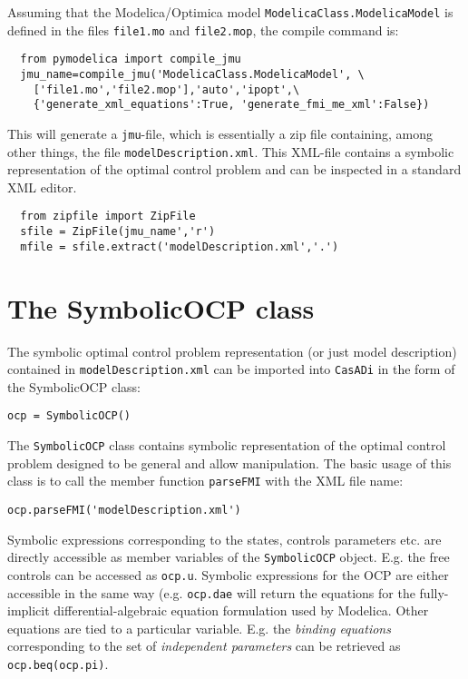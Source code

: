 \documentclass[a4paper,12pt]{book}
\newcommand{\CasADi}{\texttt{CasADi}\xspace}
\begin{document}
Assuming that the Modelica/Optimica model \texttt{ModelicaClass.ModelicaModel} is defined in the files \texttt{file1.mo} and \texttt{file2.mop}, the compile command is:
\begin{verbatim}
  from pymodelica import compile_jmu
  jmu_name=compile_jmu('ModelicaClass.ModelicaModel', \
    ['file1.mo','file2.mop'],'auto','ipopt',\
    {'generate_xml_equations':True, 'generate_fmi_me_xml':False})
\end{verbatim}

This will generate a \texttt{jmu}-file, which is essentially a zip file containing, among other things, the file \texttt{modelDescription.xml}. This XML-file contains a symbolic representation of the optimal control problem and can be inspected in a standard XML editor.
\begin{verbatim}
  from zipfile import ZipFile
  sfile = ZipFile(jmu_name','r')
  mfile = sfile.extract('modelDescription.xml','.')
\end{verbatim}

\section{The SymbolicOCP class} \label{sec:modelica_import}
The symbolic optimal control problem representation (or just model description) contained in \texttt{modelDescription.xml} can be imported into \CasADi in the form of the SymbolicOCP class:
\begin{verbatim}
ocp = SymbolicOCP()
\end{verbatim}

The \texttt{SymbolicOCP} class contains symbolic representation of the optimal control problem designed to be general and allow manipulation. The basic usage of this class is to call the member function \texttt{parseFMI} with the XML file name:
\begin{verbatim}
ocp.parseFMI('modelDescription.xml')
\end{verbatim}

Symbolic expressions corresponding to the states, controls parameters etc. are directly accessible as member variables of the \texttt{SymbolicOCP} object. E.g. the free controls can be accessed as \verb|ocp.u|. Symbolic expressions for the OCP are either accessible in the same way (e.g. \verb|ocp.dae| will return the equations for the fully-implicit differential-algebraic equation formulation used by Modelica. Other equations are tied to a particular variable. E.g. the \emph{binding equations} corresponding to the set of \emph{independent parameters} can be retrieved as \verb|ocp.beq(ocp.pi)|. 
\end{document}
